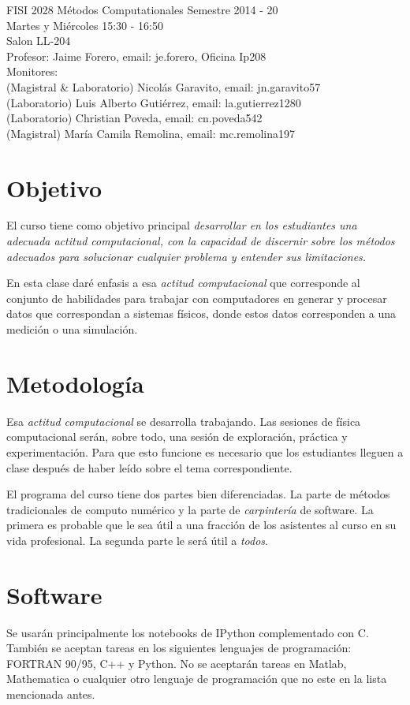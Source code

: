 \documentclass[11pt]{article}
\begin{document}
\noindent
FISI 2028 M\'etodos Computationales
Semestre 2014 - 20\\
Martes y Mi\'ercoles 15:30 - 16:50 \\
Salon LL-204\\
Profesor: Jaime Forero, email: je.forero, Oficina Ip208\\
Monitores: \\
(Magistral \& Laboratorio) Nicol\'as Garavito, email: jn.garavito57\\
(Laboratorio) Luis Alberto Guti\'errez, email: la.gutierrez1280\\
(Laboratorio) Christian Poveda, email: cn.poveda542\\
(Magistral) Mar\'ia Camila Remolina, email: mc.remolina197\\


\section*{Objetivo}
El curso tiene como objetivo principal \emph{desarrollar en los
  estudiantes una adecuada actitud computacional, con la capacidad de
  discernir sobre los m\'etodos adecuados para solucionar cualquier
  problema y entender sus limitaciones.} 
 
En esta clase dar\'e enfasis a esa \emph{actitud computacional} que
corresponde al conjunto de habilidades para trabajar con computadores
en generar y procesar datos que correspondan a sistemas f\'isicos,
donde estos datos corresponden a una medici\'on o una simulaci\'on. 

\section*{Metodolog\'ia}
Esa \emph{actitud computacional} se desarrolla trabajando. Las
sesiones de f\'isica computacional ser\'an, sobre todo, una sesi\'on
de exploraci\'on, pr\'actica y experimentaci\'on. Para que esto
funcione es necesario que los estudiantes lleguen a clase despu\'es de
haber le\'ido sobre el tema correspondiente. 

El programa del curso tiene dos partes bien diferenciadas. La parte de
m\'etodos tradicionales de computo num\'erico y la parte de
\emph{carpinter\'ia} de software. La primera es probable que le sea
\'util a una fracci\'on de los asistentes al curso en su vida
profesional. La segunda parte le ser\'a \'util a \emph{todos}. 


\section*{Software}
\noindent Se usar\'an principalmente los notebooks de IPython
complementado con C. Tambi\'en se aceptan tareas en los siguientes
lenguajes de programaci\'on: FORTRAN 90/95, C++ y Python. No se
aceptar\'an tareas en Matlab, Mathematica o cualquier otro lenguaje
de programaci\'on que no este en la lista mencionada antes.  
\end{document}
